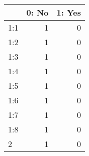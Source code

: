 \documentclass[]{article}
\begin{document}
\begin{table}[H]
\centering\begingroup\fontsize{30}{32}\selectfont

\begin{tabular}{l|r|r}
\hline
  & 0: No &  1: Yes\\
\hline
1:1 & 1 & 0\\
\hline
1:2 & 1 & 0\\
\hline
1:3 & 1 & 0\\
\hline
1:4 & 1 & 0\\
\hline
1:5 & 1 & 0\\
\hline
1:6 & 1 & 0\\
\hline
1:7 & 1 & 0\\
\hline
1:8 & 1 & 0\\
\hline
2 & 1 & 0\\
\hline
\end{tabular}
\endgroup{}
\end{table}
\end{document}
